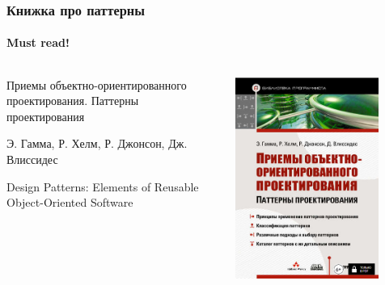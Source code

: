 \documentclass{../../slides-style}
\begin{document}
    \begin{frame}
        \frametitle{Книжка про паттерны}
        \framesubtitle{Must read!}

        \begin{columns}
            \begin{column}{0.6\textwidth}
                Приемы объектно-ориентированного проектирования. Паттерны проектирования

                Э. Гамма, Р. Хелм, Р. Джонсон, Дж. Влиссидес

                Design Patterns: Elements of Reusable Object-Oriented Software
            \end{column}
            \begin{column}{0.4\textwidth}
                \begin{center}
                    \includegraphics[width=0.8\textwidth]{patternBookCover.png}
                \end{center}
            \end{column}
        \end{columns}
    \end{frame}
\end{document}
